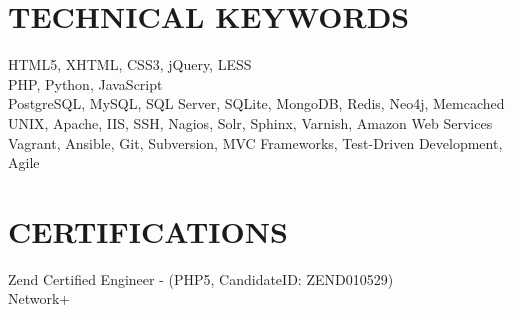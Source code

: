 \documentclass{res}
\begin{document}
\begin{resume}
\section{TECHNICAL KEYWORDS}

    HTML5, XHTML, CSS3, jQuery, LESS \\
    PHP, Python, JavaScript \\
    PostgreSQL, MySQL, SQL Server, SQLite, MongoDB, Redis, Neo4j, Memcached \\
    UNIX, Apache, IIS, SSH, Nagios, Solr, Sphinx, Varnish, Amazon Web Services \\
    Vagrant, Ansible, Git, Subversion, MVC Frameworks, Test-Driven Development, Agile


\section{CERTIFICATIONS}
    Zend Certified Engineer - (PHP5, CandidateID: ZEND010529) \\
    Network+

\end{resume}
\end{document}
